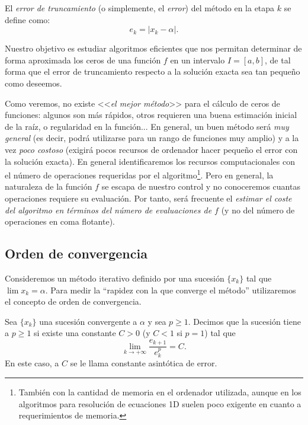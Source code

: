 El \textit{error de truncamiento} (o simplemente, el
\textit{error}) del método en la etapa $k$ se define como:
$$
e_k = |x_k - \alpha|.
$$

Nuestro objetivo es estudiar algoritmos eficientes que nos permitan
determinar de forma aproximada los ceros de una función $f$ en un
intervalo $I=[a,b]$, de tal forma que el error de truncamiento
respecto a la solución exacta sea tan pequeño como deseemos.

Como veremos, no existe <<\textit{el mejor método}>> para el cálculo
de ceros de funciones: algunos son más rápidos, otros requieren una
buena estimación inicial de la raíz, o regularidad en la función... En
general, un buen método será \emph{muy general} (es decir, podrá
utilizarse para un rango de funciones muy amplio) y a la vez
\emph{poco costoso} (exigirá pocos recursos de ordenador hacer pequeño
el error con la solución exacta). En general identificaremos los
recursos computacionales con el número de operaciones requeridas por
el algoritmo\footnote{También con la cantidad de memoria en el
  ordenador utilizada, aunque en los algoritmos para resolución de
  ecuaciones 1D suelen poco exigente en cuanto a requerimientos de
  memoria.}. Pero en general, la naturaleza de la función $f$ se
escapa de nuestro control y no conoceremos cuantas operaciones
requiere su evaluación.  Por tanto, será frecuente el \emph{estimar el
  coste del algoritmo en términos del número de evaluaciones de $f$}
(y no del número de operaciones en coma flotante).



\subsection*{Orden de convergencia}

Consideremos un método iterativo definido por una sucesión $\{x_k\}$
tal que $\lim x_k=\alpha$.
Para medir la ``rapidez con la que converge el método''
utilizaremos el concepto de orden de convergencia.

\begin{definition}
  \label{def:orden-convergencia}
  Sea $\{x_k\}$ una sucesión convergente a $\alpha$ y sea $p\ge
  1$.
  Decimos que la sucesión tiene  a $p\ge 1$ si existe una constante $C>0$ (y
  $C<1$ si $p=1$) tal que
  \begin{equation}
    \label{eq:orden-convergencia}
    \lim_{k\to+\infty} \frac{e_{k+1}}{e_k^p} = C.
  \end{equation}
  En este caso, a $C$ se le llama constante asintótica de error.
\end{definition}

